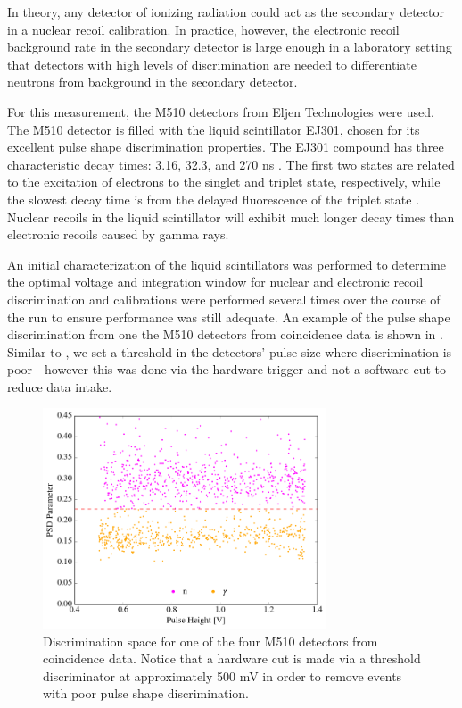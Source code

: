 In theory, any detector of ionizing radiation could act as the secondary detector in a nuclear recoil calibration.  In practice, however, the electronic recoil background rate in the secondary detector is large enough in a laboratory setting that detectors with high levels of discrimination are needed to differentiate neutrons from background in the secondary detector.

For this measurement, the M510 detectors from Eljen Technologies were used.  The M510 detector is filled with the liquid scintillator EJ301, chosen for its excellent pulse shape discrimination properties.  The EJ301 compound has three characteristic decay times: 3.16, 32.3, and 270 ns \cite{kuchnir1968time, ej301_manual}.  The first two states are related to the excitation of electrons to the singlet and triplet state, respectively, while the slowest decay time is from the delayed fluorescence of the triplet state \cite{lang2017improved}.  Nuclear recoils in the liquid scintillator will exhibit much longer decay times than electronic recoils caused by gamma rays.  

An initial characterization of the liquid scintillators was performed to determine the optimal voltage and integration window for nuclear and electronic recoil discrimination and calibrations were performed several times over the course of the run to ensure performance was still adequate.  An example of the pulse shape discrimination from one the M510 detectors from coincidence data is shown in .  Similar to , we set a threshold in the detectors' pulse size where discrimination is poor - however this was done via the hardware trigger and not a software cut to reduce data intake. 

\begin{figure}[t]
        \centering
	\includegraphics[width=0.75\textwidth]{nerix_coin_ej}
	\caption{Discrimination space for one of the four M510 detectors from coincidence data.  Notice that a hardware cut is made via a threshold discriminator at approximately 500 mV in order to remove events with poor pulse shape discrimination.}
	\label{fig:nerix_ej_discrimination}
\end{figure}

